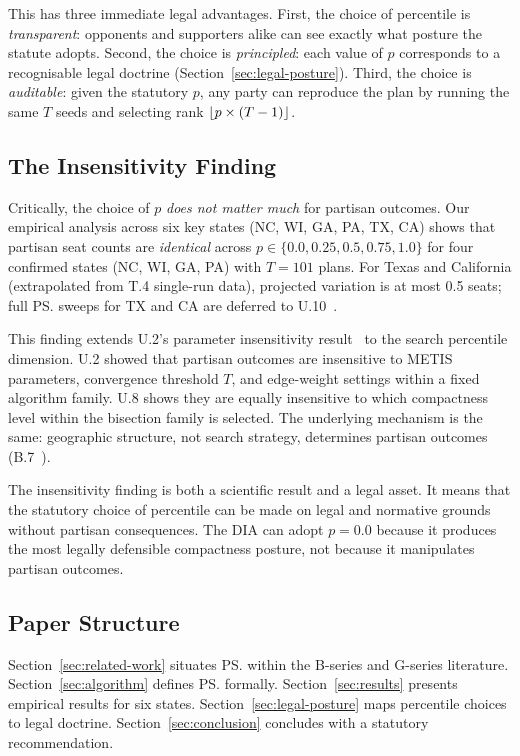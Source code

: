 This has three immediate legal advantages.
First, the choice of percentile is \emph{transparent}: opponents and
supporters alike can see exactly what posture the statute adopts.
Second, the choice is \emph{principled}: each value of $p$ corresponds to
a recognisable legal doctrine (Section~\ref{sec:legal-posture}).
Third, the choice is \emph{auditable}: given the statutory $p$, any party
can reproduce the plan by running the same $T$ seeds and selecting rank
$\lfloor p \times (T-1) \rfloor$.

\subsection{The Insensitivity Finding}

Critically, the choice of $p$ \emph{does not matter much} for partisan
outcomes.
Our empirical analysis across six key states (NC, WI, GA, PA, TX, CA) shows
that partisan seat counts are \emph{identical} across $p \in \{0.0, 0.25, 0.5,
0.75, 1.0\}$ for four confirmed states (NC, WI, GA, PA) with $T = 101$ plans.
For Texas and California (extrapolated from T.4 single-run data), projected
variation is at most 0.5 seats; full \ps{} sweeps for TX and CA are deferred
to U.10~\citep{h2paper}.

This finding extends U.2's parameter insensitivity result~\citep{b17paper}
to the search percentile dimension.
U.2 showed that partisan outcomes are insensitive to METIS parameters,
convergence threshold $T$, and edge-weight settings within a fixed algorithm
family.
U.8 shows they are equally insensitive to which compactness level within
the bisection family is selected.
The underlying mechanism is the same: geographic structure, not search
strategy, determines partisan outcomes (B.7~\citep{b7paper}).

The insensitivity finding is both a scientific result and a legal asset.
It means that the statutory choice of percentile can be made on legal and
normative grounds without partisan consequences.
The DIA can adopt $p = 0.0$ because it produces the most legally defensible
compactness posture, not because it manipulates partisan outcomes.

\subsection{Paper Structure}

Section~\ref{sec:related-work} situates \ps{} within the B-series
and G-series literature.
Section~\ref{sec:algorithm} defines \ps{} formally.
Section~\ref{sec:results} presents empirical results for six states.
Section~\ref{sec:legal-posture} maps percentile choices to legal doctrine.
Section~\ref{sec:conclusion} concludes with a statutory recommendation.
